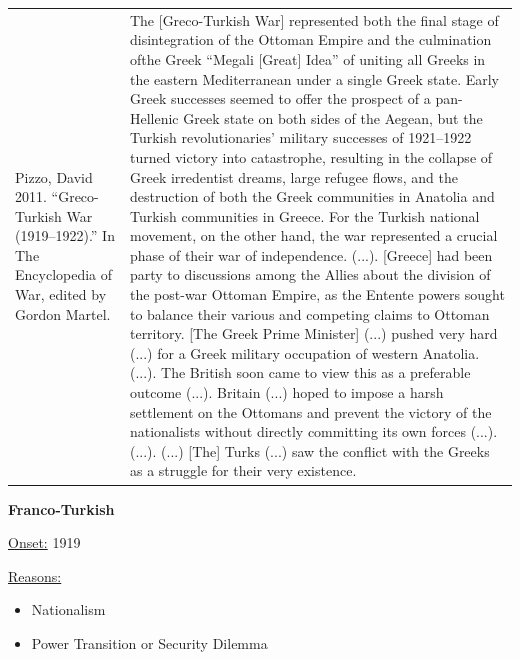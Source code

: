 {\begin{longtable}{p{}p{}}
\\
Pizzo, David 2011. “Greco-Turkish War (1919–1922).” In The Encyclopedia of War, edited by Gordon Martel. & The [Greco-Turkish War] represented both the final stage of disintegration of the Ottoman Empire and the culmination ofthe Greek “Megali [Great] Idea” of uniting all Greeks in the eastern Mediterranean under a single Greek state. Early Greek successes seemed to offer the prospect of a pan-Hellenic Greek state on both sides of the Aegean, but the Turkish revolutionaries' military successes of 1921–1922 turned victory into catastrophe, resulting in the collapse of Greek irredentist dreams, large refugee flows, and the destruction of both the Greek communities in Anatolia and Turkish communities in Greece. For the Turkish national movement, on the other hand, the war represented a crucial phase of their war of independence. (...).
[Greece] had been party to discussions among the Allies about the division of the post-war Ottoman Empire, as the Entente powers sought to balance their various and competing claims to Ottoman territory. [The Greek Prime Minister] (...) pushed very hard (...) for a Greek military occupation of western Anatolia. (...). The British soon came to view this as a preferable outcome (...). Britain (...) hoped to impose a harsh settlement on the Ottomans and prevent the victory of the nationalists without directly committing its own forces (...). (...). (...) [The] Turks (...) saw the conflict with the Greeks as a struggle for their very existence.
\\
\end{longtable}}
\clearpage
         \textbf{Franco-Turkish} 

          \underline{Onset:} 1919         

\underline{Reasons:}
\begin{itemize}
\item Nationalism
\item Power Transition or Security Dilemma
\end{itemize}

